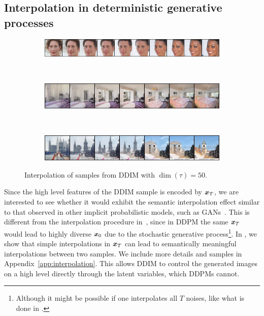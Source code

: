 \subsection{Interpolation in deterministic generative processes} 
\begin{figure}[h]
\begin{subfigure}{\textwidth}
    \centering
    \includegraphics[width=\textwidth]{figures/celeba-interp-line.png}
\end{subfigure}
~
\begin{subfigure}{\textwidth}
    \centering
    \includegraphics[width=\textwidth]{figures/bedroom-interp-line.png}
\end{subfigure}
~
\begin{subfigure}{\textwidth}
    \centering
    \includegraphics[width=\textwidth]{figures/church-interp-line.png}
\end{subfigure}
\caption{Interpolation of samples from DDIM with $\dim(\tau) = 50$.}
\label{fig:interp-line}
\end{figure}
Since the high level features of the DDIM sample is encoded by ${\bm{x}}_T$, we are interested to see whether it would exhibit the semantic interpolation effect similar to that observed in other implicit probabilistic models, such as GANs~\citep{goodfellow2014generative}. This is different from the interpolation procedure in~\citet{ho2020denoising}, since in DDPM the same ${\bm{x}}_T$ would lead to highly diverse ${\bm{x}}_0$ due to the stochastic generative process\footnote{Although it might be possible if one interpolates all $T$ noises, like what is done in \citet{song2020improved}.}. In , we show that simple interpolations in ${\bm{x}}_T$ can lead to semantically meaningful interpolations between two samples. We include more details and samples in Appendix~\ref{app:interpolation}. This allows DDIM to control the generated images on a high level directly through the latent variables, which DDPMs cannot.

